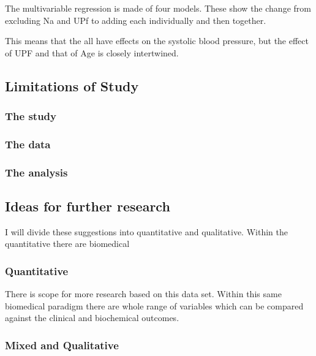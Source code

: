 \documentclass[
]{article}
\begin{document}
The multivariable regression is made of four models. These show the
change from excluding Na and UPf to adding each individually and then
together.

This means that the all have effects on the systolic blood pressure, but
the effect of UPF and that of Age is closely intertwined.

\hypertarget{limitations-of-study}{%
\subsection{Limitations of Study}\label{limitations-of-study}}

\hypertarget{the-study}{%
\subsubsection{The study}\label{the-study}}

\hypertarget{the-data}{%
\subsubsection{The data}\label{the-data}}

\hypertarget{the-analysis}{%
\subsubsection{The analysis}\label{the-analysis}}

\hypertarget{ideas-for-further-research}{%
\subsection{Ideas for further
research}\label{ideas-for-further-research}}

I will divide these suggestions into quantitative and qualitative.
Within the quantitative there are biomedical

\hypertarget{quantitative}{%
\subsubsection{Quantitative}\label{quantitative}}

There is scope for more research based on this data set. Within this
same biomedical paradigm there are whole range of variables which can be
compared against the clinical and biochemical outcomes.

\hypertarget{mixed-and-qualitative}{%
\subsubsection{Mixed and Qualitative}\label{mixed-and-qualitative}}
\end{document}
